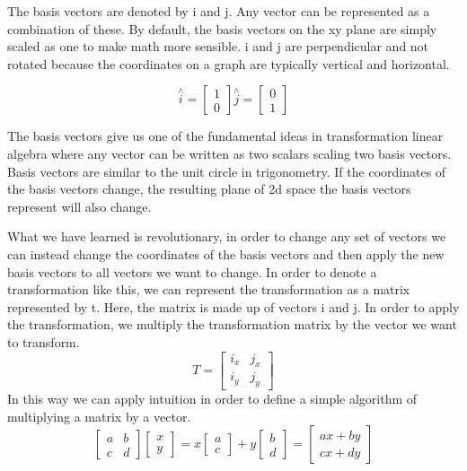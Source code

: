 The basis vectors are denoted by i and j. Any vector can be represented as a combination of these. By default, the basis vectors on the xy plane are simply scaled as one to make math more sensible. i and j are perpendicular and not rotated because the coordinates on a graph are typically vertical and horizontal.

\begin{equation}
	\overset{\wedge}{i}=\begin{bmatrix} 1\\0 \end{bmatrix} \overset{\wedge}{j}=\begin{bmatrix} 0\\1 \end{bmatrix}
\end{equation}


The basis vectors give us one of the fundamental ideas in transformation linear algebra where any vector can be written as two scalars scaling two basis vectors. Basis vectors are similar to the unit circle in trigonometry. If the coordinates of the basis vectors change, the resulting plane of 2d space the basis vectors represent will also change. 

What we have learned is revolutionary, in order to change any set of vectors we can instead change the coordinates of the basis vectors and then apply the new basis vectors to all vectors we want to change. In order to denote a transformation like this, we can represent the transformation as a matrix represented by t. Here, the matrix is made up of vectors i and j. In order to apply the transformation, we multiply the transformation matrix by the vector we want to transform. 
\begin{equation}T=\begin{bmatrix} i_{x} & j_{x} \\ i_{y} & j_{y} \end{bmatrix}\end{equation}
In this way we can apply intuition in order to define a simple algorithm of multiplying a matrix by a vector.
\begin{equation}\begin{bmatrix} a & b \\ c & d \end{bmatrix}\begin{bmatrix} x \\ y \end{bmatrix} = x\begin{bmatrix}  a \\ c \end{bmatrix} + y\begin{bmatrix} b \\ d \end{bmatrix} = \begin{bmatrix} ax+by \\ cx+dy \end{bmatrix}\end{equation}

